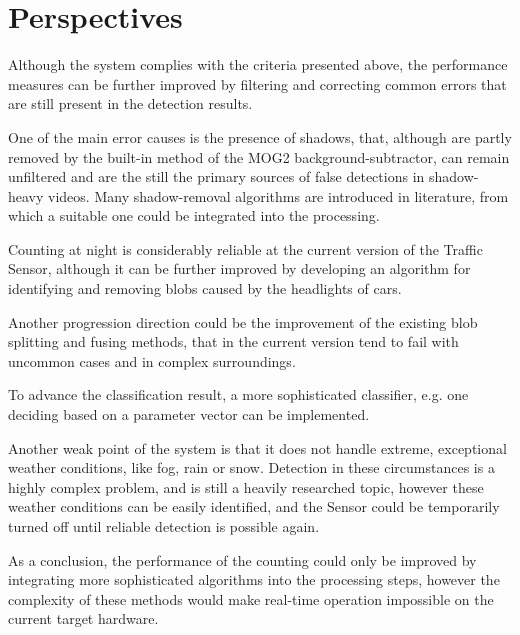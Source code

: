 
\section{Perspectives}
Although the system complies with the criteria presented above, the performance measures can be further improved by filtering and correcting common errors that are still present in the detection results.

One of the main error causes is the presence of shadows, that, although are partly removed by the built-in method of the MOG2 background-subtractor, can remain unfiltered and are the still the primary sources of false detections in shadow-heavy videos.
Many shadow-removal algorithms are introduced in literature, from which a suitable one could be integrated into the processing.

Counting at night is considerably reliable at the current version of the Traffic Sensor, although it can be further improved by developing an algorithm for identifying and removing blobs caused by the headlights of cars.

Another progression direction could be the improvement of the existing blob splitting and fusing methods, that in the current version tend to fail with uncommon cases and in complex surroundings.

To advance the classification result, a more sophisticated classifier, e.g. one deciding based on a parameter vector can be implemented.

Another weak point of the system is that it does not handle extreme, exceptional weather conditions, like fog, rain or snow.
Detection in these circumstances is a highly complex problem, and is still a heavily researched topic, however these weather conditions can be easily identified, and the Sensor could be temporarily turned off until reliable detection is possible again.
	
As a conclusion, the performance of the counting could only be improved by integrating more sophisticated algorithms into the processing steps, however the complexity of these methods would make real-time operation impossible on the current target hardware.